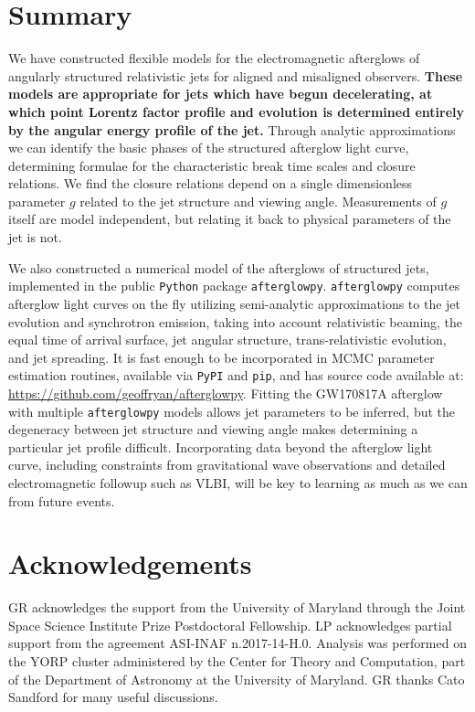 \documentclass[twocolumn]{aastex62}
\newcommand{\gwbns}{GW170817A}
\newcommand{\afterglowpy}{{\tt afterglowpy}}
\newcommand{\python}{{\tt Python}}
\begin{document}
\section{Summary}\label{sec:summary}

We have constructed flexible models for the electromagnetic afterglows of angularly structured relativistic jets for aligned and misaligned observers.  {\bf These models are appropriate for jets which have begun decelerating, at which point Lorentz factor profile and evolution is determined entirely by the angular energy profile of the jet.}  Through analytic approximations we can identify the basic phases of the structured afterglow light curve, determining formulae for the characteristic break time scales and closure relations.  We find the closure relations depend on a single dimensionless parameter $g$ related to the jet structure and viewing angle.  Measurements of $g$ itself are model independent, but relating it back to physical parameters of the jet is not.

We also constructed a numerical model of the afterglows of structured jets, implemented in the public \python{} package \afterglowpy{}. \afterglowpy{} computes afterglow light curves on the fly utilizing semi-analytic approximations to the jet evolution and synchrotron emission, taking into account relativistic beaming, the equal time of arrival surface, jet angular structure, trans-relativistic evolution, and jet spreading.  It is fast enough to be incorporated in MCMC parameter estimation routines, available via {\tt PyPI} and {\tt pip}, and has source code available at: \url{https://github.com/geoffryan/afterglowpy}. Fitting the \gwbns{} afterglow with multiple \afterglowpy{} models allows jet parameters to be inferred, but the degeneracy between jet structure and viewing angle makes determining a particular jet profile difficult.  Incorporating data beyond the afterglow light curve, including constraints from gravitational wave observations and detailed electromagnetic followup such as VLBI, will be key to learning as much as we can from future events.

\section{Acknowledgements} \label{sec:acknowledgements}

GR acknowledges the support from the University of Maryland through the Joint Space Science Institute Prize Postdoctoral Fellowship. LP acknowledges partial support from the agreement ASI-INAF n.2017-14-H.0. Analysis was performed on the YORP cluster administered by the Center for Theory and Computation, part of the Department of Astronomy at the University of Maryland.  GR thanks Cato Sandford for many useful discussions.
\end{document}
